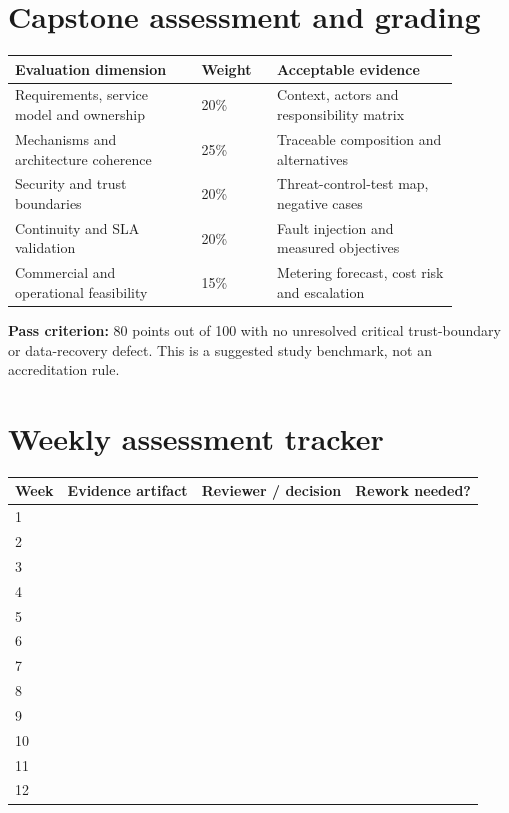 \documentclass[10pt,letterpaper]{article}
\begin{document}
\section{Capstone assessment and grading}
\small\begin{longtable}{p{0.37\linewidth}p{0.15\linewidth}p{0.36\linewidth}}
\toprule Evaluation dimension & Weight & Acceptable evidence \\\midrule
Requirements, service model and ownership & 20\% & Context, actors and responsibility matrix \\
Mechanisms and architecture coherence & 25\% & Traceable composition and alternatives \\
Security and trust boundaries & 20\% & Threat-control-test map, negative cases \\
Continuity and SLA validation & 20\% & Fault injection and measured objectives \\
Commercial and operational feasibility & 15\% & Metering forecast, cost risk and escalation \\\bottomrule
\end{longtable}\normalsize
\textbf{Pass criterion:} 80 points out of 100 with no unresolved critical trust-boundary or data-recovery defect. This is a suggested study benchmark, not an accreditation rule.
\section{Weekly assessment tracker}
\small\begin{longtable}{p{.12\linewidth}p{.28\linewidth}p{.28\linewidth}p{.20\linewidth}}
\toprule Week & Evidence artifact & Reviewer / decision & Rework needed? \\\midrule
1 & \rule{0pt}{25pt} & & \\ \midrule
2 & \rule{0pt}{25pt} & & \\ \midrule
3 & \rule{0pt}{25pt} & & \\ \midrule
4 & \rule{0pt}{25pt} & & \\ \midrule
5 & \rule{0pt}{25pt} & & \\ \midrule
6 & \rule{0pt}{25pt} & & \\ \midrule
7 & \rule{0pt}{25pt} & & \\ \midrule
8 & \rule{0pt}{25pt} & & \\ \midrule
9 & \rule{0pt}{25pt} & & \\ \midrule
10 & \rule{0pt}{25pt} & & \\ \midrule
11 & \rule{0pt}{25pt} & & \\ \midrule
12 & \rule{0pt}{25pt} & & \\ \midrule
\end{longtable}\normalsize

\end{document}
